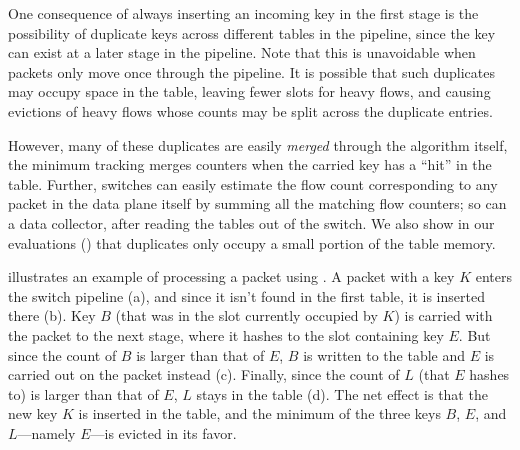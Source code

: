 One consequence of always inserting an incoming key in the first stage is the
possibility of duplicate keys across different tables in the pipeline, since the
key can exist at a later stage in the pipeline. Note that this is unavoidable
when packets only move once through the pipeline. It is possible that such
duplicates may occupy space in the table, leaving fewer slots for heavy flows,
and causing evictions of heavy flows whose counts may be split across the
duplicate entries.

\label{sec:coalescing}
However, many of these duplicates are easily {\em merged} through the algorithm
itself, \ie the minimum tracking merges counters when the carried key has a
``hit'' in the table. Further, switches can easily estimate the flow count
corresponding to any packet in the data plane itself by summing all the matching
flow counters; so can a data collector, after reading the tables out of the
switch. We also show in our evaluations () that
duplicates only occupy a small portion of the table memory.

 illustrates an example of processing a packet using \TheSystem. A
packet with a key $K$ enters the switch pipeline (a), and since it isn't found
in the first table, it is inserted there (b). Key $B$ (that was in the slot
currently occupied by $K$) is carried with the packet to the next stage, where
it hashes to the slot containing key $E$. But since the count of $B$ is larger
than that of $E$, $B$ is written to the table and $E$ is carried out on the
packet instead (c). Finally, since the count of $L$ (that $E$ hashes to) is
larger than that of $E$, $L$ stays in the table (d). The net effect is that the new
key $K$ is inserted in the table, and the minimum of the three keys $B$, $E$, and
$L$---namely $E$---is evicted in its favor.


